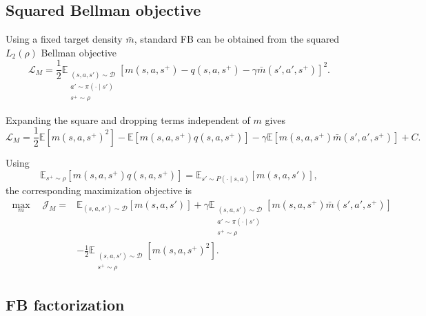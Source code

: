 \documentclass[11pt]{article}
\begin{document}
\subsection{Squared Bellman objective}
Using a fixed target density $\bar m$, standard FB can be obtained from the squared $L_2(\rho)$ Bellman objective
\[
    \mathcal L_M = \frac12\mathbb E_{\substack{(s,a,s')\sim\mathcal D\\a'\sim\pi(\cdot\mid s')\\s^+\sim\rho}}\left[m(s,a,s^+)-q(s,a,s^+)-\gamma\bar m(s',a',s^+)\right]^2.
\]

Expanding the square and dropping terms independent of $m$ gives
\[
    \mathcal L_M = \frac12\mathbb E[m(s,a,s^+)^2]-\mathbb E[m(s,a,s^+)q(s,a,s^+)]-\gamma\mathbb E[m(s,a,s^+)\bar m(s',a',s^+)]+C.
\]

Using
\[
    \mathbb E_{s^+\sim\rho}[m(s,a,s^+)q(s,a,s^+)] = \mathbb E_{s'\sim P(\cdot\mid s,a)}[m(s,a,s')],
\]
the corresponding maximization objective is
\begin{equation}
\boxed{
\begin{aligned}
    \max_m\quad \mathcal J_M ={}&   \mathbb E_{(s,a,s')\sim\mathcal D}[m(s,a,s')] + \gamma\mathbb E_{\substack{(s,a,s')\sim\mathcal D\\a'\sim\pi(\cdot\mid
                                    s')\\s^+\sim\rho}}\left[m(s,a,s^+)\bar m(s',a',s^+)\right] \\
                                &   - \frac12\mathbb E_{\substack{(s,a,s')\sim\mathcal D\\s^+\sim\rho}}\left[m(s,a,s^+)^2\right].
\end{aligned}
}
\label{eq:M-objective}
\end{equation}

\subsection{FB factorization}
\end{document}
